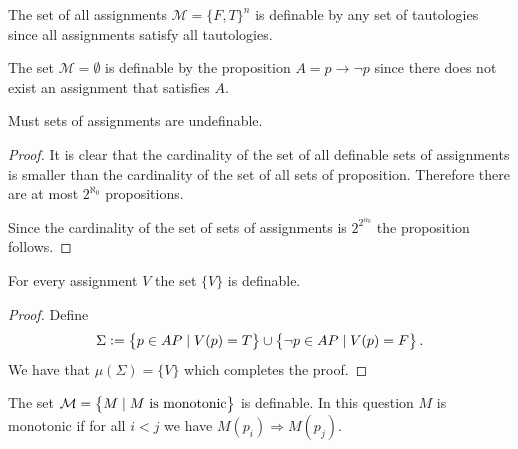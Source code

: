 \documentclass[11pt,a4paper]{article}
\renewcommand{\implies}{\rightarrow}
\begin{document}
\begin{example}
  The set of all assignments $\mathcal M = \{F, T\}^{n}$ is definable
  by any set of tautologies since all assignments satisfy all tautologies.
\end{example}
\begin{example}
  The set $\mathcal M = \emptyset$ is definable by the proposition
  $A = p \implies \neg p$ since there does not exist an assignment
  that satisfies $A$.
\end{example}

\begin{proposition}
  Must sets of assignments are undefinable.
\end{proposition}
\begin{proof}
  It is clear that the cardinality of the set of all definable sets of 
  assignments is smaller than the cardinality of the set of all
  sets of proposition. Therefore there are at most $2^{\aleph_0}$
  propositions.

  Since the cardinality of the set of sets of assignments is
  $2^{2^{\alpha_0}}$ the proposition follows.
\end{proof}

\begin{proposition}
  For every assignment $V$ the set $\{V\}$ is definable.
\end{proposition}
\begin{proof}
  Define
  \[
    \Sigma :=
    \left\{p \in AP \mid V(p) = T\right\} \cup
    \left\{\neg p \in AP \mid V(p) = F\right\}.
  \]
  We have that $\mu(\Sigma) = \{V\}$ which completes the proof.
\end{proof}

\begin{proposition}
  The set $\mathcal M = \left\{M \mid M \text{ is monotonic}\right\}$ is definable.
  In this question $M$ is monotonic if for all $i < j$ we have
  $M(p_i) \Rightarrow M(p_j)$.
\end{proposition}
\end{document}
